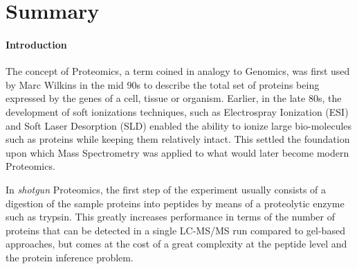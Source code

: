 %
%
%
%
%

\chapter{Summary}




\subsubsection*{Introduction}
The concept of Proteomics, a term coined in analogy to Genomics,
was first used by Marc Wilkins in the mid 90s to describe
the total set of proteins being expressed by the genes of a cell,
tissue or organism.
Earlier, in the late 80s, the development of soft ionizations techniques, 
such as Electrospray Ionization (ESI) and Soft Laser Desorption (SLD)
enabled the ability to ionize large bio-molecules such as proteins while
keeping them relatively intact. This settled the foundation upon which
Mass Spectrometry was applied to what would later become modern Proteomics.

In \textit{shotgun} Proteomics, the first step of the experiment usually
consists of a digestion of the sample proteins into peptides by means of
a proteolytic enzyme such as trypsin. This greatly increases performance
in terms of the number of proteins that can be detected in a single 
LC-MS/MS run compared to gel-based approaches, but comes at the cost 
of a great complexity at the peptide level and the protein inference problem. 


